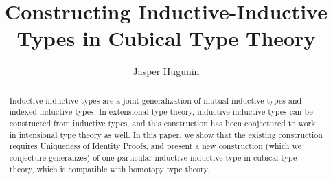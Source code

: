 \documentclass[runningheads]{llncs}
\begin{document}
\title{Constructing Inductive-Inductive Types in Cubical Type Theory}

\author{Jasper Hugunin}

\maketitle

\begin{abstract}
Inductive-inductive types are a joint generalization of mutual inductive types and indexed inductive types. In extensional type theory, inductive-inductive types can be constructed from inductive types, and this construction has been conjectured to work in intensional type theory as well. In this paper, we show that the existing construction requires Uniqueness of Identity Proofs, and present a new construction (which we conjecture generalizes) of one particular inductive-inductive type in cubical type theory, which is compatible with homotopy type theory.
\end{abstract}
\end{document}
